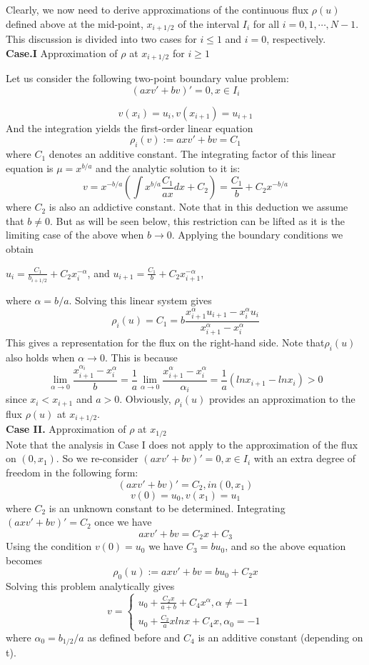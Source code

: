 \documentclass{article}
\begin{document}
Clearly, we now need to derive approximations of the continuous flux $\rho(u)$ defined above at the mid-point, $x_{i+1/2}$ of the interval $I_i$ for all $i = 0, 1, \cdots, N-1$. This discussion is divided into two cases for $i \leq 1$ and $i = 0$, respectively.\\
\textbf{Case.I} Approximation of $\rho$ at $x_{i+1/2}$ for $i \geq 1$

Let us consider the following two-point boundary value problem:
$$
(axv' + bv)' = 0 , x \in I_i
$$

$$
v(x_i) = u_i, v(x_{i+1}) = u_{i+1}
$$
And the integration yields the first-order linear equation
$$
\rho_i(v) := axv' +bv = C_1
$$
where $C_1$ denotes an additive constant. The integrating factor of this linear equation is $\mu = x^{b/a}$ and the analytic solution to it is:
$$ v = x^{-b/a}(\int  x^{b/a} \frac{C_1}{ax}dx + C_2) = \frac{C_1}{b}+C_2 x^{-b/a}
$$
where $C_2$ is also an addictive constant. Note that in this deduction we assume that $b \neq 0$. But as will be seen below, this restriction can be lifted as it is the limiting case of the above when $b \rightarrow 0$. Applying the boundary conditions we obtain
\begin{center}
$u_i = \frac{C_1}{b_{i+1/2}} + C_2 x_i^{-\alpha}$, and $u_{i+1} = \frac{C_1}{b}+ C_2 x_{i+1}^{-\alpha}$,
\end{center}
where $\alpha = b/a$. Solving this linear system gives
$$
\rho_i(u) = C_1 = b\frac{x_{i+1}^{\alpha}u_{i+1}- x_{i}^{\alpha}u_{i}}{x_{i+1}^{\alpha} - x_{i}^{\alpha}}
$$
This gives a representation for the flux on the right-hand side. Note that$\rho_i(u)$ also holds when $\alpha \rightarrow 0$. This is because
\begin{equation}
\lim_{\alpha \rightarrow 0} \frac{x_{i+1}^{\alpha_i} - x_{i}^{\alpha}}{b} = \frac{1}{a}\lim_{\alpha \rightarrow 0} \frac{x_{i+1}^{\alpha} - x_{i}^{\alpha}}{\alpha_i} = \frac{1}{a}(lnx_{i+1} - lnx_i) > 0
\end{equation}
since $x_i < x_{i+1}$ and $a > 0$. Obviously, $\rho_i(u)$ provides an approximation to the flux $\rho(u)$ at $x_{i+1/2}$.\\
\textbf{Case II.} Approximation of $\rho$ at $x_{1/2}$\\

Note that the analysis in Case I does not apply to the approximation of the flux on $(0, x_1)$. So we re-consider $(axv' + bv)' = 0 , x \in I_i$ with an extra degree of freedom in the following form:
$$
(axv' + bv)' = C_2, in (0,x_1)
$$
$$
v(0) = u_0, v(x_1) = u_1
$$
where $C_2$ is an unknown constant to be determined. Integrating $(axv' + bv)' = C_2$ once we have
$$
axv' + bv  = C_2 x + C_3 
$$
Using the condition $v(0) = u_0$ we have $C_3 = bu_0$, and so the above equation becomes
$$
\rho_0(u) := axv' + bv = bu_0 + C_2x
$$
Solving this problem analytically gives
$$
v = \left\{\begin{matrix}
u_0 + \frac{C_2x}{a+b}+C_4x^{\alpha}, \alpha \neq -1\\ 
u_0 + \frac{C_2}{a}xlnx+C_4x, \alpha_0= -1\end{matrix}\right.
$$
where $\alpha_0 = b_{1/2}/a$ as defined before and $C_4$ is an additive constant (depending on t).
\end{document}
